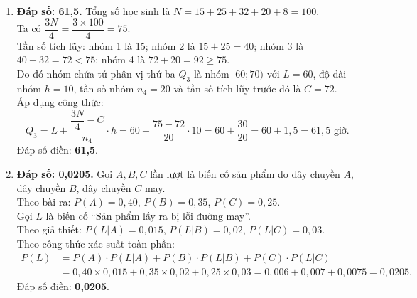 \documentclass[12pt,a4paper]{article}
\begin{document}
\begin{enumerate}[label=\textbf{Câu \arabic*:}, leftmargin=*]
\item \textbf{Đáp số: 61,5.}
Tổng số học sinh là $N = 15 + 25 + 32 + 20 + 8 = 100$.\\
Ta có $\dfrac{3N}{4} = \dfrac{3 \times 100}{4} = 75$.\\
Tần số tích lũy: nhóm 1 là 15; nhóm 2 là $15 + 25 = 40$; nhóm 3 là $40 + 32 = 72 < 75$; nhóm 4 là $72 + 20 = 92 \ge 75$.\\
Do đó nhóm chứa tứ phân vị thứ ba $Q_3$ là nhóm $[60; 70)$ với $L = 60$, độ dài nhóm $h = 10$, tần số nhóm $n_4 = 20$ và tần số tích lũy trước đó là $C = 72$.\\
Áp dụng công thức:
$$Q_3 = L + \dfrac{\dfrac{3N}{4} - C}{n_4} \cdot h = 60 + \dfrac{75 - 72}{20} \cdot 10 = 60 + \dfrac{30}{20} = 60 + 1{,}5 = 61{,}5\text{ giờ}.$$
Đáp số điền: \textbf{61,5}.

\item \textbf{Đáp số: 0,0205.}
Gọi $A, B, C$ lần lượt là biến cố sản phẩm do dây chuyền $A$, dây chuyền $B$, dây chuyền $C$ may.\\
Theo bài ra: $P(A) = 0{,}40$, $P(B) = 0{,}35$, $P(C) = 0{,}25$.\\
Gọi $L$ là biến cố ``Sản phẩm lấy ra bị lỗi đường may''.\\
Theo giả thiết: $P(L|A) = 0{,}015$, $P(L|B) = 0{,}02$, $P(L|C) = 0{,}03$.\\
Theo công thức xác suất toàn phần:
\begin{align*}
P(L) &= P(A) \cdot P(L|A) + P(B) \cdot P(L|B) + P(C) \cdot P(L|C) \\
&= 0{,}40 \times 0{,}015 + 0{,}35 \times 0{,}02 + 0{,}25 \times 0{,}03 = 0{,}006 + 0{,}007 + 0{,}0075 = 0{,}0205.
\end{align*}
Đáp số điền: \textbf{0,0205}.


\end{enumerate}
\end{document}
